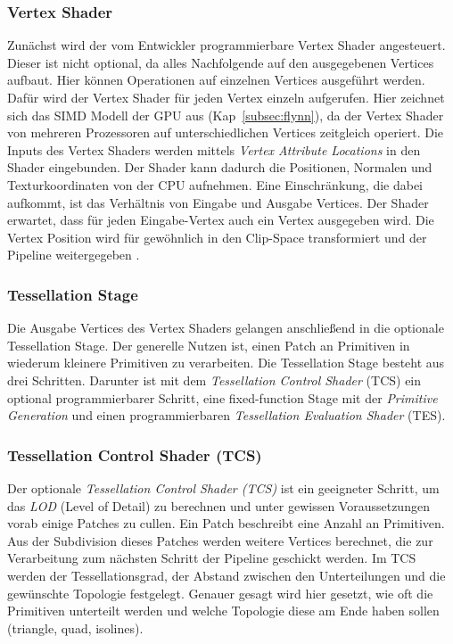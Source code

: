 \subsubsection{Vertex Shader}
\label{subsubsec:vertex}
Zunächst wird der vom Entwickler programmierbare Vertex Shader angesteuert.
Dieser ist nicht optional, da alles Nachfolgende auf den ausgegebenen Vertices aufbaut.
Hier können Operationen auf einzelnen Vertices ausgeführt werden.
Dafür wird der Vertex Shader für jeden Vertex einzeln aufgerufen.
Hier zeichnet sich das SIMD Modell der GPU aus (Kap~\ref{subsec:flynn}), da der Vertex Shader von mehreren Prozessoren auf unterschiedlichen Vertices zeitgleich operiert.
Die Inputs des Vertex Shaders werden mittels \textit{Vertex Attribute Locations} in den Shader eingebunden.
Der Shader kann dadurch die Positionen, Normalen und Texturkoordinaten von der CPU aufnehmen.
Eine Einschränkung, die dabei aufkommt, ist das Verhältnis von Eingabe und Ausgabe Vertices.
Der Shader erwartet, dass für jeden Eingabe-Vertex auch ein Vertex ausgegeben wird.
Die Vertex Position wird für gewöhnlich in den Clip-Space transformiert und der Pipeline weitergegeben \cite{Maughan2001}.

\subsubsection{Tessellation Stage}
\label{subsubsec:tesselation}
Die Ausgabe Vertices des Vertex Shaders gelangen anschließend in die optionale Tessellation Stage.
Der generelle Nutzen ist, einen Patch an Primitiven in wiederum kleinere Primitiven zu verarbeiten. 
Die Tessellation Stage besteht aus drei Schritten.
Darunter ist mit dem \textit{Tessellation Control Shader} (TCS) ein optional programmierbarer Schritt, eine fixed-function Stage mit der \textit{Primitive Generation} und einen programmierbaren \textit{Tessellation Evaluation Shader} (TES).

\subsubsection*{Tessellation Control Shader (TCS)}
Der optionale \textit{Tessellation Control Shader (TCS)} ist ein geeigneter Schritt, um das \textit{LOD} (Level of Detail) zu berechnen und unter gewissen Voraussetzungen vorab einige Patches zu cullen. 
Ein Patch beschreibt eine Anzahl an Primitiven.
Aus der Subdivision dieses Patches werden weitere Vertices berechnet, die zur Verarbeitung zum nächsten Schritt der Pipeline geschickt werden.
Im TCS werden der Tessellationsgrad, der Abstand zwischen den Unterteilungen und die gewünschte Topologie festgelegt.
Genauer gesagt wird hier gesetzt, wie oft die Primitiven unterteilt werden und welche Topologie diese am Ende haben sollen (triangle, quad, isolines).

